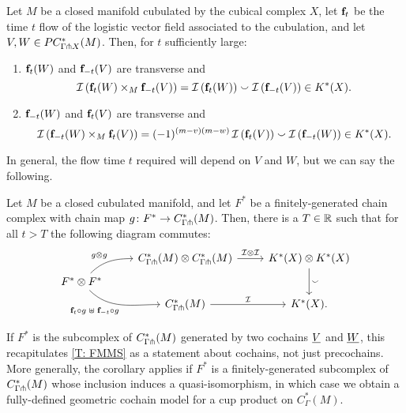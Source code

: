 \begin{theorem}\label{T: FMMS}
	Let $M$ be a closed manifold cubulated by the cubical complex $X$, let $\mathbf{f}_t$ be the time $t$ flow of the logistic vector field associated to the cubulation, and let $V,W \in PC^*_{\Gamma \pitchfork X}(M)$.
	Then, for $t$ sufficiently large:
	\begin{enumerate}
		\item $\mathbf{f}_t(W)$ and $\mathbf{f}_{-t}(V)$ are transverse and
		\[
		\mathcal{I} \left(\mathbf{f}_t(W) \times_M \mathbf{f}_{-t}(V)\right) = \mathcal{I} \left(\mathbf{f}_t(W)\right) \smallsmile \mathcal{I} \left(\mathbf{f}_{-t}(V)\right) \in K^*(X).
		\]
		\item $\mathbf{f}_{-t}(W)$ and $\mathbf{f}_t(V)$ are transverse and
		\[
		\mathcal{I} \left(\mathbf{f}_{-t}(W) \times_M \mathbf{f}_t(V)\right) = (-1)^{(m-v)(m-w)} \, \mathcal{I} \left(\mathbf{f}_t(V)\right) \smallsmile \mathcal{I} \left(\mathbf{f}_{-t}(W)\right) \in K^*(X).
		\]
	\end{enumerate}
\end{theorem}



In general, the flow time $t$ required will depend on $V$ and $W$, but we can say the following.

\begin{corollary}
	Let $M$ be a closed cubulated manifold, and let $F^*$ be a finitely-generated chain complex with chain map $g \colon F^*\to C^*_{\Gamma \pitchfork}(M)$.
	Then, there is a $T \in \mathbb{R}$ such that for all $t > T$ the following diagram commutes:
	\[
	\begin{tikzcd} [row sep=tiny]
		& C^*_{\Gamma \pf}(M) \otimes C^*_{\Gamma \pf}(M) \arrow[r, "\mc I \otimes \mc I"] & K^*(X) \otimes K^*(X) \arrow[dd, "\sms"] \\
		F^*\otimes F^* \arrow[ur, in=180, out=45,"g\otimes g"] \arrow[dr, in=180, out=-45, "\f_t \circ g \; \uplus \; \f_{-t} \circ g"']& & \\
		& C^*_{\Gamma \pf}(M) \arrow[r, "\mc I"] & K^*(X).
	\end{tikzcd}
	\]
\end{corollary}

If $F^*$ is the subcomplex of $C^*_{\Gamma \pitchfork}(M)$ generated by two cochains $\underline{V}$ and $\underline{W}$, this recapitulates \cref{T: FMMS} as a statement about cochains, not just precochains.
More generally, the corollary applies if $F^*$ is a finitely-generated subcomplex of $C^*_{\Gamma \pitchfork}(M)$ whose inclusion induces a quasi-isomorphism, in which case we obtain a fully-defined geometric cochain model for a cup product on $C^*_\Gamma(M)$.


